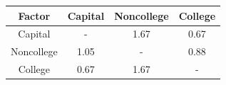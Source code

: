 \begin{table}[!ht]
\setlength\tabcolsep{0.425em}
\setlength\aboverulesep{0pt}
\setlength\belowrulesep{0.2em}
\centering
\begin{threeparttable}
\begin{tabular}{cccc}
\toprule[0.1em]
Factor & Capital & Noncollege & College \\[0.2em]
\midrule[0.075em]
Capital & - & 1.67 & 0.67 \\[0.2em]
Noncollege & 1.05 & - & 0.88 \\[0.2em]
College & 0.67 & 1.67 & - \\[0.2em]
\bottomrule[0.1em]
\end{tabular}
\end{threeparttable}
\end{table}

